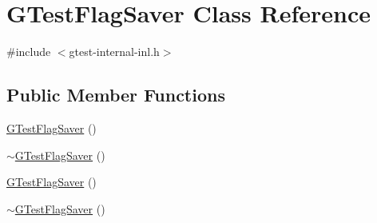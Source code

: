 \hypertarget{classtesting_1_1internal_1_1GTestFlagSaver}{\section{\-G\-Test\-Flag\-Saver \-Class \-Reference}
\label{dd/d56/classtesting_1_1internal_1_1GTestFlagSaver}
}


{\ttfamily \#include $<$gtest-\/internal-\/inl.\-h$>$}

\subsection*{\-Public \-Member \-Functions}
\begin{DoxyCompactItemize}
\item 
\hyperlink{classtesting_1_1internal_1_1GTestFlagSaver_af8bb58de70e4599ba7ec7ec2ee645ca4}{\-G\-Test\-Flag\-Saver} ()
\item 
\hyperlink{classtesting_1_1internal_1_1GTestFlagSaver_a31fdc095cacf255eb30aefd46dd05cb0}{$\sim$\-G\-Test\-Flag\-Saver} ()
\item 
\hyperlink{classtesting_1_1internal_1_1GTestFlagSaver_af8bb58de70e4599ba7ec7ec2ee645ca4}{\-G\-Test\-Flag\-Saver} ()
\item 
\hyperlink{classtesting_1_1internal_1_1GTestFlagSaver_a31fdc095cacf255eb30aefd46dd05cb0}{$\sim$\-G\-Test\-Flag\-Saver} ()
\end{DoxyCompactItemize}
